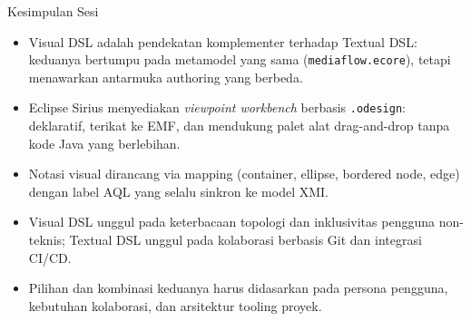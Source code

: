 \documentclass[aspectratio=169, table]{beamer}
\begin{document}
\begin{frame}{Kesimpulan Sesi}
\vspace{12pt}
\begin{itemize}
  \item Visual DSL adalah pendekatan komplementer terhadap Textual DSL: keduanya bertumpu pada metamodel yang sama (\texttt{mediaflow.ecore}), tetapi menawarkan antarmuka authoring yang berbeda.
  \item Eclipse Sirius menyediakan \textit{viewpoint workbench} berbasis \texttt{.odesign}: deklaratif, terikat ke EMF, dan mendukung palet alat drag-and-drop tanpa kode Java yang berlebihan.
  \item Notasi visual dirancang via mapping (container, ellipse, bordered node, edge) dengan label AQL yang selalu sinkron ke model XMI.
  \item Visual DSL unggul pada keterbacaan topologi dan inklusivitas pengguna non-teknis; Textual DSL unggul pada kolaborasi berbasis Git dan integrasi CI/CD.
  \item Pilihan dan kombinasi keduanya harus didasarkan pada persona pengguna, kebutuhan kolaborasi, dan arsitektur tooling proyek.
\end{itemize}
\end{frame}
\end{document}
